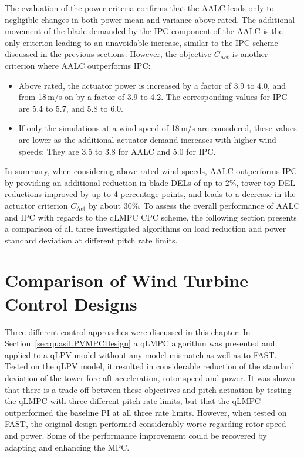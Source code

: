%
The evaluation of the power criteria confirms that the AALC leads only to negligible changes in both power mean and variance above rated. The additional movement of the blade demanded by the IPC component of the AALC is the only criterion leading to an unavoidable increase, similar to the IPC scheme discussed in the previous sections. However, the objective $C_{\text{Act}}$ is another criterion where AALC outperforms IPC: 
\begin{itemize}
    \item Above rated, the actuator power is increased by a factor of 3.9 to 4.0, and from 18\,m/s on by a factor of 3.9 to 4.2. The corresponding values for IPC are 5.4 to 5.7, and 5.8 to 6.0.
    \item If only the simulations at a wind speed of 18\,m/s are considered, these values are lower as the additional actuator demand increases with higher wind speeds: They are 3.5 to 3.8 for AALC and 5.0 for IPC.
\end{itemize}
In summary, when considering above-rated wind speeds, AALC outperforms IPC by providing an additional reduction in blade DELs of up to 2\%, tower top DEL reductions improved by up to 4 percentage points, and leads to a decrease in the actuator criterion $C_{\text{Act}}$ by about 30\%. To assess the overall performance of AALC and  IPC with regards to the qLMPC CPC scheme, the following section presents a comparison of all three investigated algorithms on load reduction and  power standard deviation at different pitch rate limits.



\section{Comparison of Wind Turbine Control Designs}
\label{subsec:ComparisonWindTurbineControlDesigns}

Three different control approaches were discussed in this chapter: In Section~\ref{sec:quasiLPVMPCDesign} a qLMPC algorithm was presented and applied to a qLPV model without any model mismatch as well as to FAST. Tested on the qLPV model, it resulted in considerable reduction of the standard deviation of the tower fore-aft acceleration, rotor speed and power. It was shown that there is a trade-off between these objectives and pitch actuation by testing the qLMPC with three different pitch rate limits, but that the qLMPC outperformed the baseline PI at all three rate limits. However, when tested on FAST, the original design performed considerably worse regarding rotor speed and power. Some of the performance improvement could be recovered by adapting and enhancing the MPC. 

